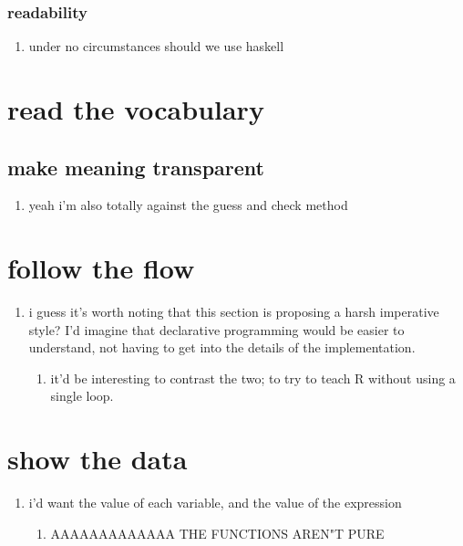 \subsubsection{readability}
\begin{enumerate}
	\item under no circumstances should we use haskell
\end{enumerate}
\section{read the vocabulary}
\subsection{make meaning transparent}
\begin{enumerate}
	\item yeah i'm also totally against the guess and check method
\end{enumerate}
\section{follow the flow}
\begin{enumerate}
	\item i guess it's worth noting that this section is proposing a harsh imperative style? I'd imagine that declarative programming would be easier to understand, not having to get into the details of the implementation.
	\begin{enumerate}
		\item it'd be interesting to contrast the two; to try to teach R without using a single loop.
	\end{enumerate}
\end{enumerate}
\section{show the data}
\begin{enumerate}
	\item i'd want the value of each variable, and the value of the expression
	\begin{enumerate}
		\item AAAAAAAAAAAAA THE FUNCTIONS AREN"T PURE
	\end{enumerate}
\end{enumerate}

